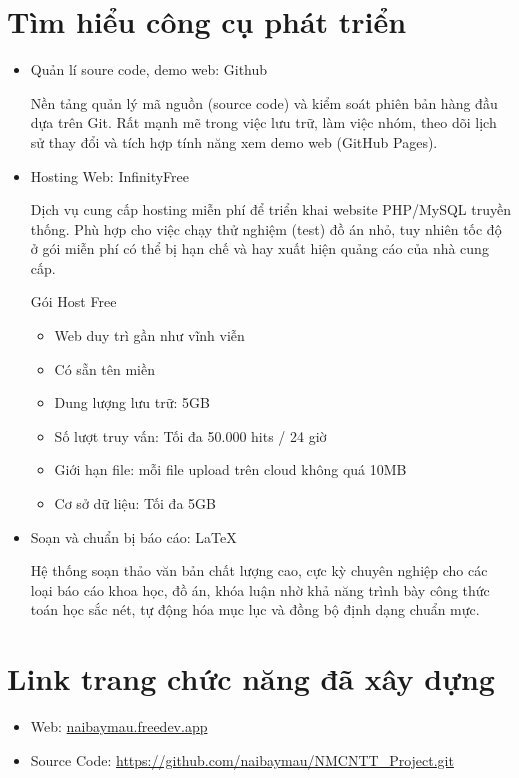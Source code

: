 \documentclass[a4paper,12pt]{report}
\numberwithin{equation}{chapter}
\begin{document}
\section{Tìm hiểu công cụ phát triển}
\begin{itemize}[leftmargin=2.2cm]
\item Quản lí soure code, demo web: Github

Nền tảng quản lý mã nguồn (source code) và kiểm soát phiên bản hàng đầu dựa trên Git. Rất mạnh mẽ trong việc lưu trữ, làm việc nhóm, theo dõi lịch sử thay đổi và tích hợp tính năng xem demo web (GitHub Pages).
\item Hosting Web: InfinityFree

Dịch vụ cung cấp hosting miễn phí để triển khai website PHP/MySQL truyền thống. Phù hợp cho việc chạy thử nghiệm (test) đồ án nhỏ, tuy nhiên tốc độ ở gói miễn phí có thể bị hạn chế và hay xuất hiện quảng cáo của nhà cung cấp.

Gói Host Free
\begin{itemize}
\item Web duy trì gần như vĩnh viễn
\item Có sẵn tên miền
\item Dung lượng lưu trữ: 5GB
\item Số lượt truy vấn: Tối đa 50.000 hits / 24 giờ
\item Giới hạn file: mỗi file upload trên cloud không quá 10MB
\item Cơ sở dữ liệu: Tối đa 5GB
\end{itemize}
\item Soạn và chuẩn bị báo cáo: LaTeX

Hệ thống soạn thảo văn bản chất lượng cao, cực kỳ chuyên nghiệp cho các loại báo cáo khoa học, đồ án, khóa luận nhờ khả năng trình bày công thức toán học sắc nét, tự động hóa mục lục và đồng bộ định dạng chuẩn mực.
\end{itemize}
\section{Link trang chức năng đã xây dựng}
\begin{itemize}[leftmargin=2.2cm]
\item Web: \url{naibaymau.freedev.app}
\item Source Code: \url{https://github.com/naibaymau/NMCNTT_Project.git}
\end{itemize}

\end{document}
